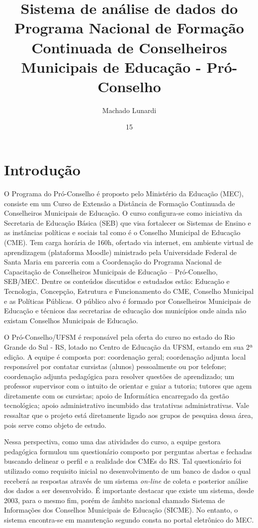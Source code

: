 \documentclass[projtg]{mdtufsm}
\title{Sistema de análise de dados do Programa Nacional de Formação Continuada de Conselheiros Municipais de Educação - Pró-Conselho}
\author{Machado Lunardi}{Gabriel}
\institute{Centro de Tecnologia}
\date{15}{Agosto}{2014}
\begin{document}
\maketitle
\setlength{\baselineskip}{1.5\baselineskip}

\chapter{Introdução}

O Programa do Pró-Conselho é proposto pelo Ministério da Educação (MEC), consiste em um Curso de Extensão a Distância de Formação Continuada de Conselheiros Municipais de Educação. O curso configura-se como iniciativa da Secretaria de Educação Básica (SEB) que visa fortalecer os Sistemas de Ensino e as instâncias políticas e sociais tal como é o Conselho Municipal de Educação (CME). Tem carga horária de 160h, ofertado via internet, em ambiente virtual de aprendizagem (plataforma Moodle) ministrado pela Universidade Federal de Santa Maria em parceria com a Coordenação do Programa Nacional de Capacitação de Conselheiros Municipais de Educação – Pró-Conselho, SEB/MEC. Dentre os conteúdos discutidos e estudados estão: Educação e Tecnologia, Concepção, Estrutura e Funcionamento do CME, Conselho Municipal e as Políticas Públicas. O público alvo é formado por Conselheiros Municipais de Educação e técnicos das secretarias de educação dos municípios onde ainda não existam Conselhos Municipais de Educação. 

 O Pró-Conselho/UFSM é responsável pela oferta do curso no estado do Rio Grande do Sul - RS, lotado no Centro de Educação da UFSM, estando em sua 2ª edição. A equipe é composta por: coordenação geral; coordenação adjunta local responsável por contatar cursistas (alunos) pessoalmente ou por telefone; coordenação adjunta pedagógica para resolver questões de aprendizado; um professor supervisor com o intuito de orientar e guiar a tutoria; tutores que agem diretamente com os cursistas; apoio de Informática encarregado da gestão tecnológica; apoio administrativo incumbido das tratativas administrativas. Vale ressaltar que o projeto está diretamente ligado aos grupos de pesquisa dessa área, pois serve como objeto de estudo. 

Nessa perspectiva, como uma das atividades do curso, a equipe gestora pedagógica formulou um questionário composto por perguntas abertas e fechadas buscando delinear o perfil e a realidade dos CMEs do RS. Tal questionário foi utilizado como requisito inicial no desenvolvimento de um banco de dados o qual receberá as respostas através de um sistema {\it on-line} de coleta e posterior análise dos dados a ser desenvolvido. É importante destacar que existe um sistema, desde 2003, para o mesmo fim, porém de âmbito nacional chamado Sistema de Informações dos Conselhos Municipais de Educação (SICME). No entanto, o sistema encontra-se em manutenção segundo consta no portal eletrônico do MEC.
\end{document}
